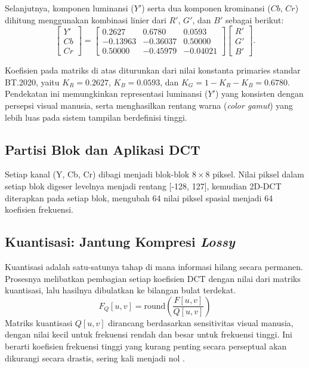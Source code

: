 \documentclass[a4paper]{article}
\begin{document}
Selanjutnya, komponen luminansi ($Y'$) serta dua komponen krominansi ($Cb$, $Cr$) dihitung menggunakan kombinasi linier dari $R'$, $G'$, dan $B'$ sebagai berikut:
\begin{equation}
  \begin{bmatrix}
    Y' \\[4pt]
    Cb \\[4pt]
    Cr
  \end{bmatrix}
  =
  \begin{bmatrix}
    0.2627   & 0.6780   & 0.0593   \\[4pt]
    -0.13963 & -0.36037 & 0.50000  \\[4pt]
    0.50000  & -0.45979 & -0.04021
  \end{bmatrix}
  \begin{bmatrix}
    R' \\[4pt]
    G' \\[4pt]
    B'
  \end{bmatrix}.
\end{equation}

Koefisien pada matriks di atas diturunkan dari nilai konstanta primaries standar BT.2020, yaitu
$K_R = 0.2627$, $K_B = 0.0593$, dan $K_G = 1 - K_R - K_B = 0.6780$.
Pendekatan ini memungkinkan representasi luminansi ($Y'$) yang konsisten dengan persepsi visual manusia,
serta menghasilkan rentang warna (\textit{color gamut}) yang lebih luas pada sistem tampilan berdefinisi tinggi.




\subsection{Partisi Blok dan Aplikasi DCT}
Setiap kanal (Y, Cb, Cr) dibagi menjadi blok-blok $8 \times 8$ piksel. Nilai piksel dalam setiap blok digeser levelnya menjadi rentang [-128, 127], kemudian 2D-DCT diterapkan pada setiap blok, mengubah 64 nilai piksel spasial menjadi 64 koefisien frekuensi.

\subsection{Kuantisasi: Jantung Kompresi \textit{Lossy}}
Kuantisasi adalah satu-satunya tahap di mana informasi hilang secara permanen. Prosesnya melibatkan pembagian setiap koefisien DCT dengan nilai dari matriks kuantisasi, lalu hasilnya dibulatkan ke bilangan bulat terdekat.
\begin{equation} \label{eq:quantization}
  F_Q[u, v] = \text{round}\left(\frac{F[u, v]}{Q[u, v]}\right)
\end{equation}
Matriks kuantisasi $Q[u,v]$ dirancang berdasarkan sensitivitas visual manusia, dengan nilai kecil untuk frekuensi rendah dan besar untuk frekuensi tinggi. Ini berarti koefisien frekuensi tinggi yang kurang penting secara perseptual akan dikurangi secara drastis, sering kali menjadi nol \cite{wallace1991jpeg}.
\end{document}
